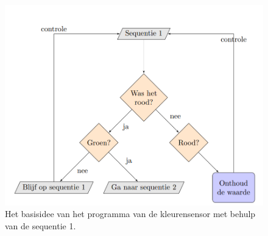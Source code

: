 \documentclass[a4paper,twoside,kulak]{kulakreport} %
\begin{document}
\begin{figure}
	\centering
	\includegraphics[width=.8\textwidth]{flowchart_sequentie1}
	\caption{Het basisidee van het programma van de kleurensensor met behulp van de sequentie 1.}
	\label{kleursensorValueOne}
\end{figure}
%	
\end{document}
